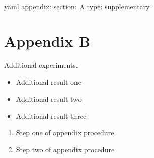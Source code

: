 \documentclass[code=listings]{SUSTechHomework}
\begin{document}
\begin{sustechcode}{yaml}
appendix:
  section: A
  type: supplementary
\end{sustechcode}

\section{Appendix B}
Additional experiments.

\begin{itemize}
  \item Additional result one
  \item Additional result two
  \item Additional result three
\end{itemize}

\begin{enumerate}
  \item Step one of appendix procedure
  \item Step two of appendix procedure
\end{enumerate}
\end{document}
